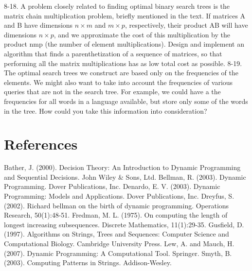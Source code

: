 8-18. A problem closely related to finding optimal binary search trees is the matrix chain multiplication problem, briefly mentioned in the text. If matrices A and B have dimensions $n \times m$ and $m \times p$, respectively, their product AB will have dimensions $n \times p$, and we approximate the cost of this multiplication by the product nmp (the number of element multiplications). Design and implement an algorithm that finds a parenthetization of a sequence of matrices, so that performing all the matrix multiplications has as low total cost as possible.
8-19. The optimal search trees we construct are based only on the frequencies of the elements. We might also want to take into account the frequencies of various queries that are not in the search tree. For example, we could have a the frequencies for all words in a language available, but store only some of the words in the tree. How could you take this information into consideration?

\section{References}
Bather, J. (2000). Decision Theory: An Introduction to Dynamic Programming and Sequential Decisions.
John Wiley \& Sons, Ltd.
Bellman, R. (2003). Dynamic Programming. Dover Publications, Inc.
Denardo, E. V. (2003). Dynamic Programming: Models and Applications. Dover Publications, Inc.
Dreyfus, S. (2002). Richard bellman on the birth of dynamic programming. Operations Research,
50(1):48-51.
Fredman, M. L. (1975). On computing the length of longest increasing subsequences. Discrete
Mathematics, 11(1):29-35.
Gusfield, D. (1997). Algorithms on Strings, Trees and Sequences: Computer Science and Computational
Biology. Cambridge University Press.
Lew, A. and Mauch, H. (2007). Dynamic Programming: A Computational Tool. Springer.
Smyth, B. (2003). Computing Patterns in Strings. Addison-Wesley.


